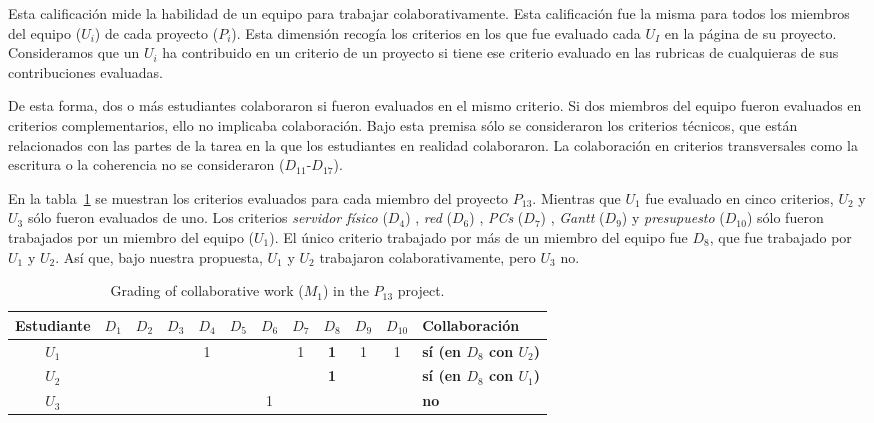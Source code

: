 Esta calificación mide la habilidad de un equipo para trabajar colaborativamente. Esta calificación fue la misma para todos los miembros del equipo ($U_i$) de cada proyecto ($P_i$). Esta dimensión recogía los criterios en los que fue evaluado cada $U_I$ en la página de su proyecto. Consideramos que un $U_i$ ha contribuido en un criterio de un proyecto si tiene ese criterio evaluado en las rubricas de cualquieras de sus contribuciones evaluadas.

De esta forma, dos o más estudiantes colaboraron si fueron evaluados en el mismo criterio. Si dos miembros del equipo fueron evaluados en criterios complementarios, ello no implicaba colaboración. Bajo esta premisa sólo se consideraron los criterios técnicos, que están relacionados con las partes de la tarea en la que los estudiantes en realidad colaboraron. La colaboración en criterios transversales como la escritura o la coherencia no se consideraron ($D_{11}$-$D_{17}$).

En la tabla~\ref{table:13-project-grades} se muestran los criterios evaluados para cada miembro del proyecto $P_{13}$. Mientras que $U_1$ fue evaluado en cinco criterios, $U_2$ y $U_3$ sólo fueron evaluados de uno. Los criterios \emph{servidor físico} ($D_4$) , \emph{red} ($D_6$) , \emph{PCs} ($D_7$) , \emph{Gantt} ($D_9$) y \emph{presupuesto} ($D_10$) sólo fueron trabajados por un miembro del equipo ($U_1$). El único criterio trabajado por más de un miembro del equipo fue $D_8$, que fue trabajado por $U_1$ y $U_2$. Así que, bajo nuestra propuesta, $U_1$ y $U_2$ trabajaron colaborativamente, pero $U_3$ no.

\begin{table}[h]
\centering
\begin{tabular}{|c|c|c|c|c|c|c|c|c|c|c|l|}
\hline
\textbf{Estudiante} & \textbf{$D_1$} & \textbf{$D_2$} & \textbf{$D_3$} & \textbf{$D_4$} & \textbf{$D_5$} & \textbf{$D_6$} & \textbf{$D_7$} & \textbf{$D_8$} & \textbf{$D_9$} & \textbf{$D_{10}$} & \textbf{Collaboración} \\ \hline
\hline
$U_1$ &   &   &   & 1 &   &     & 1   & \textbf{1}  & 1  & 1  & \textbf{sí (en $D_8$ con $U_2$)} \\ \hline
$U_2$ &   &   &   &    &   &     &      & \textbf{1}    &      &       & \textbf{sí (en $D_8$ con $U_1$)} \\ \hline
$U_3$ &   &   &   &    &   & 1  &     &      &      &       & \textbf{no} \\ \hline
\end{tabular}
\caption{Grading of collaborative work ($M_1$) in the $P_{13}$ project.}
\label{table:13-project-grades}
\end{table}

